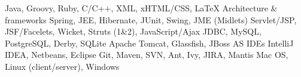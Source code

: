 
\cvcomputer
	{} {Java, Groovy, Ruby, C/C++, XML, xHTML/CSS, \LaTeX}
	{Architecture \& frameworks} {Spring, JEE, Hibernate, JUnit, Swing, JME (Midlets)}
\cvcomputer
	{} {Servlet/JSP, JSF/Facelets, Wicket, Struts (1\&2), JavaScript/Ajax}
	{} {JDBC, MySQL, PostgreSQL, Derby, SQLite}
\cvcomputer
	{} {Apache Tomcat, Glassfish, JBoss AS}
	{IDEs} {IntelliJ IDEA, Netbeans, Eclipse}
\cvcomputer
	{} {Git, Maven, SVN, Ant, Ivy, JIRA, Mantis}
	{} {Mac OS, Linux (client/server), Windows}

